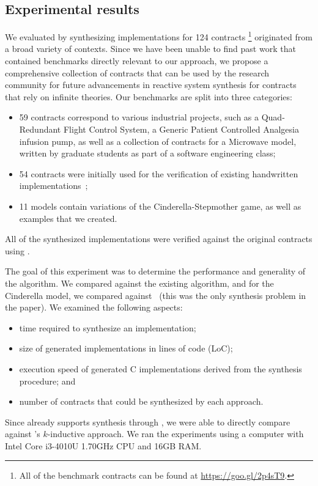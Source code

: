 \subsection{Experimental results}
\label{sec:results}

We evaluated \jsynvg by synthesizing implementations
for 124 contracts%
\footnote{All of the benchmark contracts can be found at
\url{https://goo.gl/2p4sT9}.}
originated from a broad variety of contexts. Since we have been unable to find past work that contained benchmarks directly relevant to our approach, we propose a comprehensive collection of contracts that can be used by the research community for future advancements in reactive system synthesis for contracts that rely on infinite theories. Our benchmarks are split into three categories:
\begin{itemize}
\item 59 contracts correspond to various industrial projects, such as a Quad-Redundant Flight Control System, a Generic Patient Controlled Analgesia infusion pump, as well as a collection of contracts
for a Microwave model, written by graduate students as part of a software
engineering class;
\item 54 contracts were initially used for the verification of existing handwritten implementations~\cite{hagen2008scaling};
\item 11 models contain variations of the
Cinderella-Stepmother game, as well as examples that we created.
\end{itemize}
All of the synthesized implementations were verified against the original contracts using \jkind.

The goal of this experiment was to determine the performance and generality of the \jsynvg algorithm.  We compared against the existing \jsyn algorithm, and for the Cinderella model, we compared against~\cite{beyene2014constraint} (this was the only synthesis problem in the paper).  We examined the following aspects:
\begin{itemize}
    \item time required to synthesize an implementation;
    \item size of generated implementations in lines of code (LoC);
    \item execution speed of generated C implementations derived from the synthesis procedure; and
    \item number of contracts that could be synthesized by each approach.
\end{itemize}
\noindent Since \jkind already supports synthesis through \jsyn, we were able to directly
compare \jsynvg against \jsyn's $k$-inductive approach. We
ran the experiments using a computer with Intel Core i3-4010U 1.70GHz CPU and
16GB RAM.

